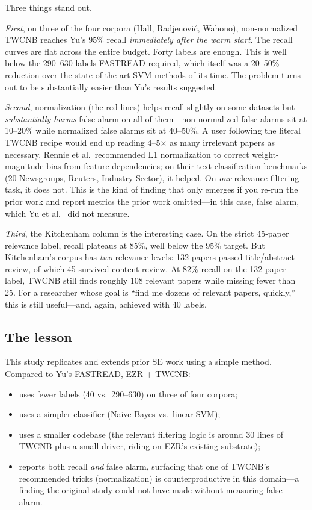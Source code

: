\documentclass[AMA,STIX2COL]{WileyNJDv5}
\begin{document}
{Three things stand out.

{\em First}, on three of the four corpora (Hall,
Radjenovi\'c, Wahono), non-normalized TWCNB reaches Yu's
95\% recall {\em immediately after the warm start}. The
recall curves are flat across the entire budget. Forty
labels are enough. This is well below the 290--630 labels
FASTREAD required, which itself was a 20--50\% reduction
over the state-of-the-art SVM methods of its time. The
problem turns out to be substantially easier than Yu's
results suggested.

{\em Second}, normalization (the red lines) helps recall
slightly on some datasets but {\em substantially harms}
false alarm on all of them---non-normalized false alarms
sit at 10--20\% while normalized false alarms sit at
40--50\%. A user following the literal TWCNB recipe would
end up reading 4--5$\times$ as many irrelevant papers as
necessary. Rennie et al.\ recommended L1 normalization to
correct weight-magnitude bias from feature dependencies; on
their text-classification benchmarks (20 Newsgroups, Reuters,
Industry Sector), it helped. On {\em our} relevance-filtering
task, it does not. This is the kind of finding that only
emerges if you re-run the prior work and report metrics the
prior work omitted---in this case, false alarm, which Yu et
al.~\cite{yu2018finding} did not measure.

{\em Third}, the Kitchenham column is the interesting case.
On the strict 45-paper relevance label, recall plateaus at
85\%, well below the 95\% target. But Kitchenham's corpus
has {\em two} relevance levels: 132 papers passed
title/abstract review, of which 45 survived content review.
At 82\% recall on the 132-paper label, TWCNB still finds
roughly 108 relevant papers while missing fewer than 25.
For a researcher whose goal is ``find me dozens of relevant
papers, quickly,'' this is still useful---and, again,
achieved with 40 labels.

\subsection*{The lesson}

This study replicates and extends prior SE work using a
simple method. Compared to Yu's FASTREAD, EZR + TWCNB:
\begin{itemize}
\item uses fewer labels (40 vs.\ 290--630) on three of four
corpora;
\item uses a simpler classifier (Naive Bayes vs.\ linear SVM);
\item uses a smaller codebase (the relevant filtering logic
is around 30 lines of TWCNB plus a small driver, riding on
EZR's existing substrate);
\item reports both recall {\em and} false alarm, surfacing
that one of TWCNB's recommended tricks (normalization) is
counterproductive in this domain---a finding the original
study could not have made without measuring false alarm.
\end{itemize}

}
\end{document}
